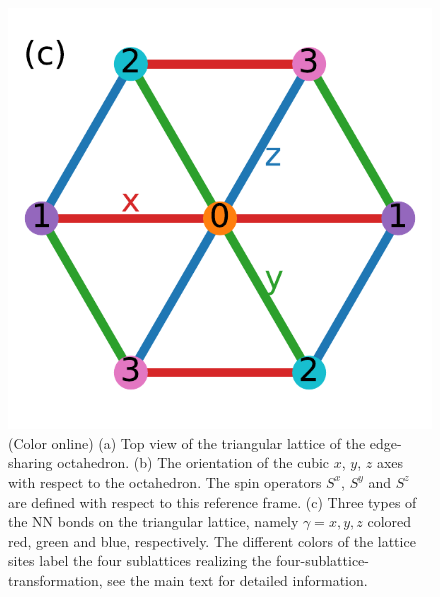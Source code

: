 \documentclass[aps,prb,reprint,amsfonts,amsmath,amssymb,showpacs,groupedaddress,superscriptaddress]{revtex4-1}
\begin{document}
\begin{figure}
\begin{minipage}{0.3\columnwidth}
        \includegraphics[width=\linewidth]{fig/ModelDefinition.pdf}
    \end{minipage}
    \caption{\label{fig:ModelDefinition}(Color online) (a) Top view of the triangular lattice of the edge-sharing octahedron. (b) The orientation of the cubic $x$, $y$, $z$ axes with respect to the octahedron. The spin operators $S^x$, $S^y$ and $S^z$ are defined with respect to this reference frame. (c) Three types of the NN bonds on the triangular lattice, namely $\gamma=x, y, z$ colored red, green and blue, respectively. The different colors of the lattice sites label the four sublattices realizing the four-sublattice-transformation, see the main text for detailed information.}
\end{figure}
\end{document}
